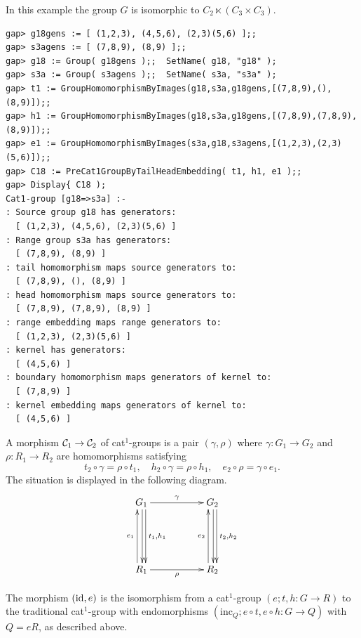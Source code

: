 \newpage 
\begin{example} \label{ex:C18}
In this example the group $G$ is isomorphic to $C_2 \ltimes (C_3 \times C_3)$. 
{\small 
\begin{verbatim}
gap> g18gens := [ (1,2,3), (4,5,6), (2,3)(5,6) ];;     
gap> s3agens := [ (7,8,9), (8,9) ];;                
gap> g18 := Group( g18gens );;  SetName( g18, "g18" ); 
gap> s3a := Group( s3agens );;  SetName( s3a, "s3a" );
gap> t1 := GroupHomomorphismByImages(g18,s3a,g18gens,[(7,8,9),(),(8,9)]);;     
gap> h1 := GroupHomomorphismByImages(g18,s3a,g18gens,[(7,8,9),(7,8,9),(8,9)]);;
gap> e1 := GroupHomomorphismByImages(s3a,g18,s3agens,[(1,2,3),(2,3)(5,6)]);; 
gap> C18 := PreCat1GroupByTailHeadEmbedding( t1, h1, e1 );;
gap> Display{ C18 );
Cat1-group [g18=>s3a] :- 
: Source group g18 has generators:
  [ (1,2,3), (4,5,6), (2,3)(5,6) ]
: Range group s3a has generators:
  [ (7,8,9), (8,9) ]
: tail homomorphism maps source generators to:
  [ (7,8,9), (), (8,9) ]
: head homomorphism maps source generators to:
  [ (7,8,9), (7,8,9), (8,9) ]
: range embedding maps range generators to:
  [ (1,2,3), (2,3)(5,6) ]
: kernel has generators:
  [ (4,5,6) ]
: boundary homomorphism maps generators of kernel to:
  [ (7,8,9) ]
: kernel embedding maps generators of kernel to:
  [ (4,5,6) ]
\end{verbatim}} 
\end{example} 

\medskip
A morphism  $\mathcal{C}_1 \to \mathcal{C}_2$  
  
of cat$^1$-groups is a pair  $(\gamma, \rho)$  where
$\gamma : G_1 \to G_2$  and  $\rho : R_1 \to R_2$  
are homomorphisms satisfying
\begin{equation} \label{eq:cat1mor}
t_2 \circ\gamma = \rho\circ t_1, \quad
h_2 \circ\gamma = \rho\circ h_1, \quad
e_2 \circ\rho = \gamma\circ e_1.
\end{equation}
The situation is displayed in the following diagram. 
\begin{equation*} \label{eq:cat1mordiag}
\vcenter{\xymatrix{
   G_1 \ar[rr]^{\gamma} \ar[dd]<1.0ex>^{t_1,h_1} \ar[dd]<0.2ex> 
     && G_2 \ar[dd]<1.0ex>^{t_2,h_2} \ar[dd]<0.2ex>\\
     &&  \\
   R_1 \ar[rr]_{\rho} \ar[uu]<1.0ex>^{e_1} 
     && R_2 \ar[uu]<1.0ex>^{e_2}
}}
\end{equation*}

The morphism $(\mathrm{id},e)$ is the isomorphism from a cat$^1$-group $(e;t,h : G \to R)$ to the traditional cat$^1$-group with endomorphisms 
$(\mathrm{inc}_Q; e \circ t, e \circ h : G \to Q)$ with $Q = eR$, 
as described above. 

